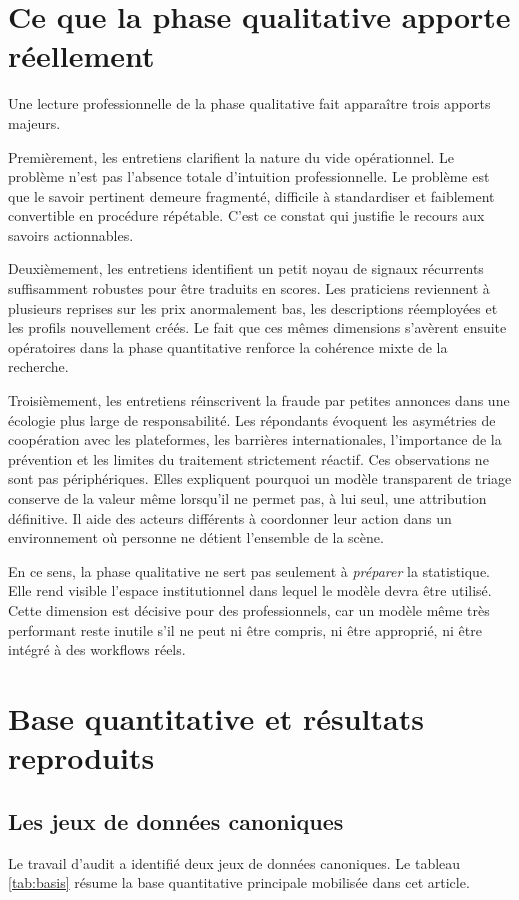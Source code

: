 \documentclass[10pt,a4paper]{article}
\begin{document}
\section{Ce que la phase qualitative apporte réellement}
Une lecture professionnelle de la phase qualitative fait apparaître trois apports majeurs.

Premièrement, les entretiens clarifient la nature du vide opérationnel. Le problème n'est pas l'absence totale d'intuition professionnelle. Le problème est que le savoir pertinent demeure fragmenté, difficile à standardiser et faiblement convertible en procédure répétable. C'est ce constat qui justifie le recours aux savoirs actionnables.

Deuxièmement, les entretiens identifient un petit noyau de signaux récurrents suffisamment robustes pour être traduits en scores. Les praticiens reviennent à plusieurs reprises sur les prix anormalement bas, les descriptions réemployées et les profils nouvellement créés. Le fait que ces mêmes dimensions s'avèrent ensuite opératoires dans la phase quantitative renforce la cohérence mixte de la recherche.

Troisièmement, les entretiens réinscrivent la fraude par petites annonces dans une écologie plus large de responsabilité. Les répondants évoquent les asymétries de coopération avec les plateformes, les barrières internationales, l'importance de la prévention et les limites du traitement strictement réactif. Ces observations ne sont pas périphériques. Elles expliquent pourquoi un modèle transparent de triage conserve de la valeur même lorsqu'il ne permet pas, à lui seul, une attribution définitive. Il aide des acteurs différents à coordonner leur action dans un environnement où personne ne détient l'ensemble de la scène.

En ce sens, la phase qualitative ne sert pas seulement à \emph{préparer} la statistique. Elle rend visible l'espace institutionnel dans lequel le modèle devra être utilisé. Cette dimension est décisive pour des professionnels, car un modèle même très performant reste inutile s'il ne peut ni être compris, ni être approprié, ni être intégré à des workflows réels.

\section{Base quantitative et résultats reproduits}
\subsection{Les jeux de données canoniques}
Le travail d'audit a identifié deux jeux de données canoniques. Le tableau \ref{tab:basis} résume la base quantitative principale mobilisée dans cet article.
\end{document}

